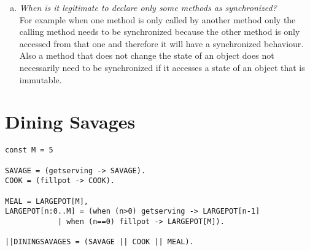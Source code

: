 \documentclass{report}
\begin{document}
\begin{enumerate}[a)]
			\item \textit{When is it legitimate to declare only some methods as synchronized?} \\
			For example when one method is only called by another method only the calling method needs to be synchronized because the other method is only accessed from that one and therefore it will have a synchronized behaviour. Also a method that does not change the state of an object does not necessarily need to be synchronized if it accesses a state of an object that is immutable.
		\end{enumerate}
	\closesection
	
	\section{Dining Savages}
	\startsection
		\begin{verbatim}
const M = 5

SAVAGE = (getserving -> SAVAGE).
COOK = (fillpot -> COOK).

MEAL = LARGEPOT[M],
LARGEPOT[n:0..M] = (when (n>0) getserving -> LARGEPOT[n-1] 
			| when (n==0) fillpot -> LARGEPOT[M]).

||DININGSAVAGES = (SAVAGE || COOK || MEAL).
		\end{verbatim}
	\closesection	
	
	\newpage	
	
\end{document}
